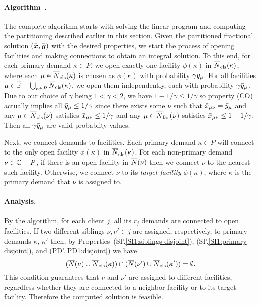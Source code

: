 \paragraph{Algorithm~{\EBGS}.}
The complete algorithm starts with solving the linear program and
computing the partitioning described earlier in this section.  Given
the partitioned fractional solution $(\bar{\boldsymbol{x}}, \bar{\boldsymbol{y}})$ with the
desired properties, we start the process of opening facilities and
making connections to obtain an integral solution. To this end, for
each primary demand $\kappa\in P$, we open exactly one facility
$\phi(\kappa)$ in ${\overline{N}}_{{\mbox{\scriptsize\rm cls}}}(\kappa)$, where each
$\mu\in{\overline{N}}_{{\mbox{\scriptsize\rm cls}}}(\kappa)$ is chosen as $\phi(\kappa)$ with
probability $\gamma{\bar y}_{\mu}$. For all facilities
$\mu\in\overline{\mathbb{F}} - \bigcup_{\kappa\in P}{\overline{N}}_{{\mbox{\scriptsize\rm cls}}}(\kappa)$, we
open them independently, each with probability
$\gamma{\bar y}_{\mu}$. Due to our choice of $\gamma$ being $1 < \gamma <
2$, we have $1-1/\gamma \leq 1/\gamma$ so property (CO) actually
implies all ${\bar y}_{\mu} \leq 1/\gamma$ since there exists some $\nu$
such that ${\bar x}_{\mu\nu} = {\bar y}_{\mu}$ and any
$\mu\in{\overline{N}}_{{\mbox{\scriptsize\rm cls}}}(\nu)$ satisfies ${\bar x}_{\mu\nu} \leq 1/\gamma$ and
any $\mu\in{\overline{N}}_{{\mbox{\scriptsize\rm far}}}(\nu)$ satisfies ${\bar x}_{\mu\nu} \leq
1-1/\gamma$. Then all $\gamma{\bar y}_{\mu}$ are valid probablity values.

Next, we connect demands to facilities.
Each primary demand $\kappa\in P$ will connect
to the only open facility $\phi(\kappa)$ in ${\overline{N}}_{{\mbox{\scriptsize\rm cls}}}(\kappa)$.  
For each non-primary demand $\nu\in \overline{\mathbb{C}} - P$, if
there is an open facility in ${\overline{N}}(\nu)$ then we connect
$\nu$ to the nearest such facility. Otherwise, we connect
$\nu$ to its \emph{target facility} $\phi(\kappa)$, where $\kappa$ is the primary
demand that $\nu$ is assigned to. 


\paragraph{Analysis.}
By the algorithm, for each client $j$, all its $r_j$ demands are connected to
open facilities. If two different siblings $\nu,\nu'\in j$ are assigned, respectively,
to primary demands $\kappa$, $\kappa'$ then, by
Properties~(SI'.\ref{SI1:siblings disjoint}), (SI'.\ref{SI1:primary
  disjoint}), and (PD'.\ref{PD1:disjoint}) we have
%
\begin{equation*}
( {\overline{N}}(\nu) \cup {\overline{N}}_{{\mbox{\scriptsize\rm cls}}}(\kappa)) \cap ({\overline{N}}(\nu')\cup {\overline{N}}_{{\mbox{\scriptsize\rm cls}}}(\kappa')) = \emptyset.
\end{equation*}
%
This condition guarantees that $\nu$ and $\nu'$ are assigned to different facilities,
regardless whether they are connected to a neighbor facility or to its target facility.
Therefore the computed solution is feasible.

